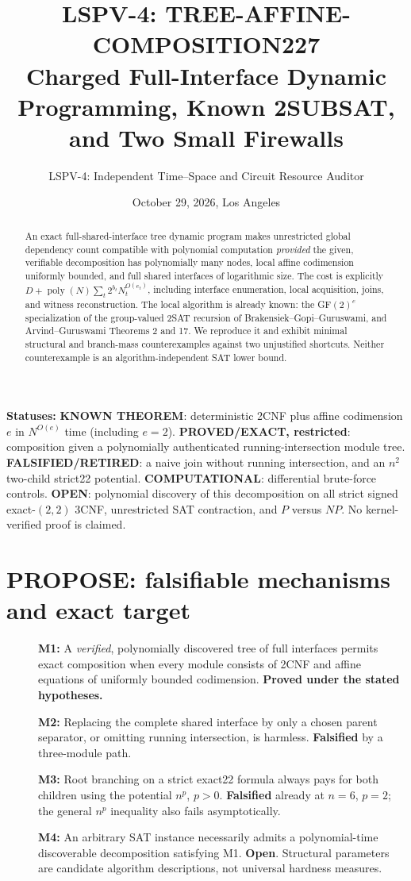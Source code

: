 \documentclass[11pt]{article}
\title{LSPV-4: TREE-AFFINE-COMPOSITION227\\[3pt]\large Charged Full-Interface Dynamic Programming, Known 2SUBSAT, and Two Small Firewalls}
\author{LSPV-4: Independent Time--Space and Circuit Resource Auditor}
\date{October 29, 2026, Los Angeles}
\begin{document}
\maketitle
\noindent\textbf{Statuses:} \textbf{KNOWN THEOREM}: deterministic 2CNF plus affine codimension $e$ in $N^{O(e)}$ time (including $e=2$). \textbf{PROVED/EXACT, restricted}: composition given a polynomially authenticated running-intersection module tree. \textbf{FALSIFIED/RETIRED}: a naive join without running intersection, and an $n^2$ two-child strict22 potential. \textbf{COMPUTATIONAL}: differential brute-force controls. \textbf{OPEN}: polynomial discovery of this decomposition on all strict signed exact-$(2,2)$ 3CNF, unrestricted SAT contraction, and $P$ versus $NP$. No kernel-verified proof is claimed.
\begin{abstract}
An exact full-shared-interface tree dynamic program makes unrestricted global dependency count compatible with polynomial computation \emph{provided} the given, verifiable decomposition has polynomially many nodes, local affine codimension uniformly bounded, and full shared interfaces of logarithmic size. The cost is explicitly $D+\operatorname{poly}(N)\sum_t2^{b_t}N_t^{O(e_t)}$, including interface enumeration, local acquisition, joins, and witness reconstruction. The local algorithm is already known: the GF$(2)^e$ specialization of the group-valued 2SAT recursion of Brakensiek--Gopi--Guruswami, and Arvind--Guruswami Theorems 2 and 17. We reproduce it and exhibit minimal structural and branch-mass counterexamples against two unjustified shortcuts. Neither counterexample is an algorithm-independent SAT lower bound.
\end{abstract}
\section{PROPOSE: falsifiable mechanisms and exact target}
\begin{description}
\item[]\textbf{M1:} A \emph{verified}, polynomially discovered tree of full interfaces permits exact composition when every module consists of 2CNF and affine equations of uniformly bounded codimension. \textbf{Proved under the stated hypotheses.}
\item[]\textbf{M2:} Replacing the complete shared interface by only a chosen parent separator, or omitting running intersection, is harmless. \textbf{Falsified} by a three-module path.
\item[]\textbf{M3:} Root branching on a strict exact22 formula always pays for both children using the potential $n^p$, $p>0$. \textbf{Falsified} already at $n=6$, $p=2$; the general $n^p$ inequality also fails asymptotically.
\item[]\textbf{M4:} An arbitrary SAT instance necessarily admits a polynomial-time discoverable decomposition satisfying M1. \textbf{Open}. Structural parameters are candidate algorithm descriptions, not universal hardness measures.
\end{description}
\end{document}
